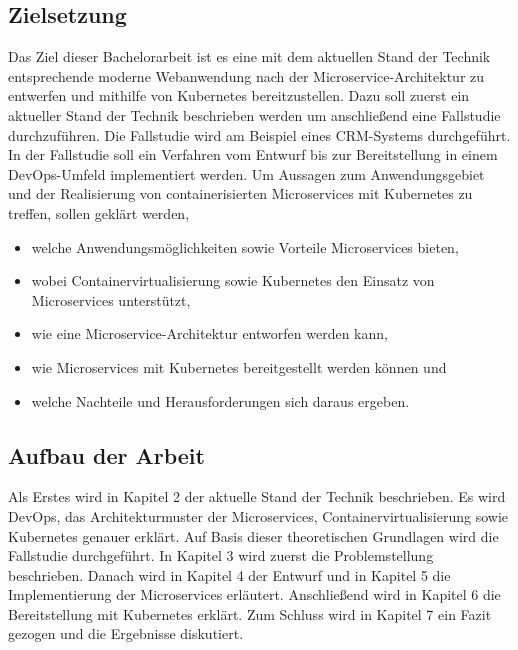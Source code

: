 \subsection{Zielsetzung}
Das Ziel dieser Bachelorarbeit ist es eine mit dem aktuellen Stand der Technik entsprechende moderne Webanwendung nach der Microservice-Architektur zu entwerfen und mithilfe von Kubernetes bereitzustellen. Dazu soll zuerst ein aktueller Stand der Technik beschrieben werden um anschließend eine Fallstudie durchzuführen. Die Fallstudie wird am Beispiel eines \acp{CRM-System} durchgeführt. In der Fallstudie soll ein Verfahren vom Entwurf bis zur Bereitstellung in einem DevOps-Umfeld implementiert werden. Um Aussagen zum Anwendungsgebiet und der Realisierung von containerisierten Microservices mit Kubernetes zu treffen, sollen geklärt werden, 

\begin{itemize}
\item welche Anwendungsmöglichkeiten sowie Vorteile Microservices bieten,
\item wobei Containervirtualisierung sowie Kubernetes den Einsatz von Microservices unterstützt,
\item wie eine Microservice-Architektur entworfen werden kann,
\item wie Microservices mit Kubernetes bereitgestellt werden können und
\item welche Nachteile und Herausforderungen sich daraus ergeben.
\end{itemize}

\subsection{Aufbau der Arbeit}

Als Erstes wird in Kapitel 2 der aktuelle Stand der Technik beschrieben. Es wird DevOps, das Architekturmuster der Microservices, Containervirtualisierung sowie Kubernetes genauer erklärt. Auf Basis dieser theoretischen Grundlagen wird die Fallstudie durchgeführt. In Kapitel 3 wird zuerst die Problemstellung beschrieben. Danach wird in Kapitel 4 der Entwurf und in Kapitel 5 die Implementierung der Microservices erläutert. Anschließend wird in Kapitel 6 die Bereitstellung mit Kubernetes erklärt. Zum Schluss wird in Kapitel 7 ein Fazit gezogen und die Ergebnisse diskutiert.


